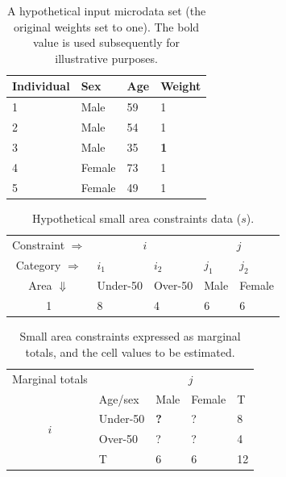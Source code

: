 \documentclass[a4paper,10pt]{article}
\begin{document}
\begin{table}[h]
\centering
\caption[A hypothetical input microdata set]{A
hypothetical input microdata set (the original
weights set to one). The bold value is used subsequently for
illustrative purposes.}
\begin{tabular}{llll}
\toprule
{Individual } & {Sex} & {Age} & {Weight} \\
\midrule
1 & Male & 59 & 1 \\
2 & Male & 54 & 1 \\
3 & {Male} & {35} & \textbf{1} \\
4 & Female & 73 & 1 \\
5 & Female & 49 & 1 \\
\bottomrule
\end{tabular}
\label{t:w}
\end{table}
\vspace{1cm}


\begin{table}[htbp]
\centering
\caption{Hypothetical small area constraints data ($s$).}
\begin{tabular}{cllll}
\toprule
Constraint $\Rightarrow$ & \multicolumn{2}{c}{$i$}& \multicolumn{2}{c}{$j$}\\
Category $\Rightarrow$ & $i_1$ & $i_2$ & $j_1$ & $j_2$ \\
Area $\Downarrow$  & Under-50 & Over-50 &  Male & Female\\
1  & 8 & 4 & 6 & 6\\
\bottomrule
\end{tabular}
\label{t:s}
\end{table}
\vspace{1cm}

\begin{table}[htbp]
\centering
\caption[Small area constraints expressed as marginal totals]{Small
area constraints expressed as marginal totals, and the cell
values to be estimated.}
\begin{tabular}{cllll}\toprule
Marginal totals&  & \multicolumn{2}{c}{$j$} & \\
& Age/sex & Male & Female & T\\ \midrule
\multirow{2}{*}{$i$} & Under-50 & \textbf{?} & ? & 8\\
& Over-50 & ? & ? &4 \\
& T & 6 & 6 &12\\
\bottomrule
\end{tabular}
\label{t:s2}
\end{table}
\end{document}

